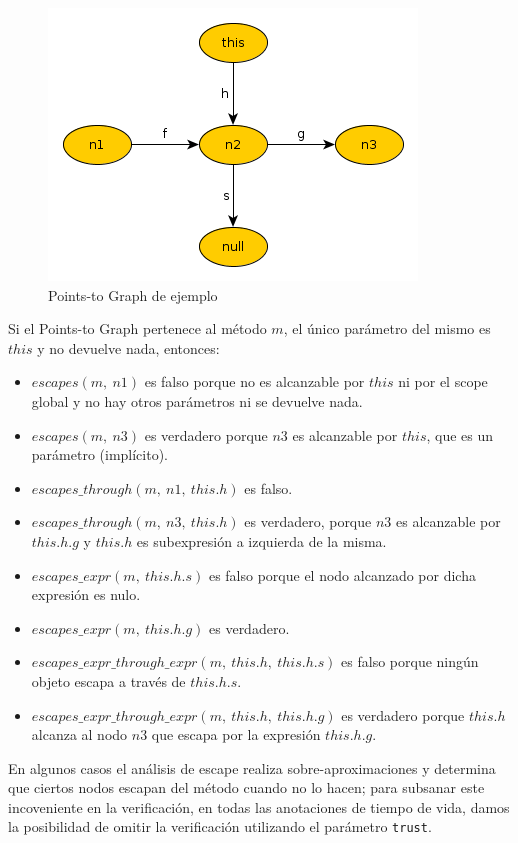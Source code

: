 \documentclass[12pt,a4paper]{article}
\newcommand\mono[1]{\texttt{#1}}
\begin{document}
			\begin{figure}[htb]
			\begin{center}
			\includegraphics[scale=0.5]{ptg.png}
			\end{center}
			\caption{Points-to Graph de ejemplo}
			\end{figure}

			Si el Points-to Graph pertenece al método $m$, el único parámetro del mismo es $this$ y no devuelve nada, entonces:

			\begin{itemize}
				\item $escapes(m,\ n1)$ es falso porque no es alcanzable por $this$ ni por el scope global y no hay otros parámetros ni se devuelve nada.
				\item $escapes(m,\ n3)$ es verdadero porque $n3$ es alcanzable por $this$, que es un parámetro (implícito).
				\item $escapes\_through(m,\ n1,\ this.h)$ es falso.
				\item $escapes\_through(m,\ n3,\ this.h)$ es verdadero, porque $n3$ es alcanzable por $this.h.g$ y $this.h$ es subexpresión a izquierda de la misma.
				\item $escapes\_expr(m,\ this.h.s)$ es falso porque el nodo alcanzado por dicha expresión es nulo.
				\item $escapes\_expr(m,\ this.h.g)$ es verdadero.
				\item $escapes\_expr\_through\_expr(m,\ this.h,\ this.h.s)$ es falso porque ningún objeto escapa a través de $this.h.s$.
				\item $escapes\_expr\_through\_expr(m,\ this.h,\ this.h.g)$ es verdadero porque $this.h$ alcanza al nodo $n3$ que escapa por la expresión $this.h.g$.
			\end{itemize}

			En algunos casos el análisis de escape realiza sobre-aproximaciones y determina que ciertos nodos escapan del método cuando no lo hacen; para subsanar este incoveniente en la verificación, en todas las anotaciones de tiempo de vida, damos la posibilidad de omitir la verificación utilizando el parámetro \mono{trust}.
\end{document}
